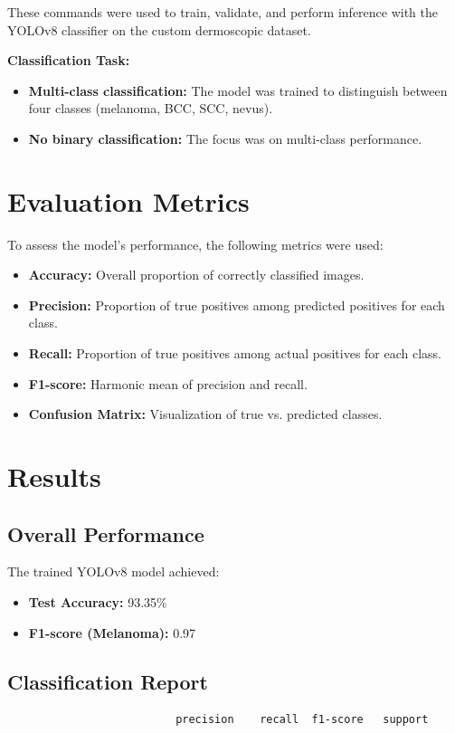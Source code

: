 \documentclass[a4paper,12pt]{report}
\begin{document}
\begin{spacing}{1.5}
    These commands were used to train, validate, and perform inference with the YOLOv8 classifier on the custom dermoscopic dataset.
        
    \textbf{Classification Task:}
    \begin{itemize}
        \item \textbf{Multi-class classification:} The model was trained to distinguish between four classes (melanoma, BCC, SCC, nevus).
        \item \textbf{No binary classification:} The focus was on multi-class performance.
    \end{itemize}
    
    \section{Evaluation Metrics}
    To assess the model's performance, the following metrics were used:
    \begin{itemize}
        \item \textbf{Accuracy:} Overall proportion of correctly classified images.
        \item \textbf{Precision:} Proportion of true positives among predicted positives for each class.
        \item \textbf{Recall:} Proportion of true positives among actual positives for each class.
        \item \textbf{F1-score:} Harmonic mean of precision and recall.
        \item \textbf{Confusion Matrix:} Visualization of true vs. predicted classes.
    \end{itemize}
    
    \section{Results}
    
    \subsection*{Overall Performance}
    The trained YOLOv8 model achieved:
    \begin{itemize}
        \item \textbf{Test Accuracy:} 93.35\%
        \item \textbf{F1-score (Melanoma):} 0.97
    \end{itemize}
    
    \subsection*{Classification Report}
    \begin{verbatim}
                          precision    recall  f1-score   support


\end{verbatim}
\end{spacing}
\end{document}
